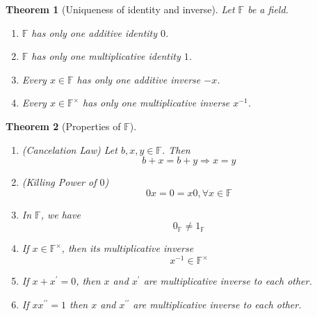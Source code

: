 \documentclass[12pt]{article}
\newtheorem{theorem}{Theorem}[section]
\theoremstyle{definition}
\begin{document}
\begin{theorem}[Uniqueness of identity and inverse]\normalfont Let $\mathbb{F}$ be a field.
\begin{enumerate}[label=(\arabic*)]
\item $\mathbb{F}$ has only one additive identity $0$.
\item $\mathbb{F}$ has only one multiplicative identity $1$.
\item Every $x\in\mathbb{F}$ has only one additive inverse $-x$.
\item Every $x\in\mathbb{F}^\times$ has only one multiplicative inverse $x^{-1}$.
\end{enumerate}
\end{theorem}
\begin{theorem}[Properties of $\mathbb{F}$]\hfill\\\normalfont
\begin{enumerate}[label=(\arabic*)]
\item (Cancelation Law) Let $b,x,y\in\mathbb{F}$. Then
\[
b+x=b+y\Rightarrow x=y
\]
\item (Killing Power of $0$)
\[
0x=0=x0,\forall x\in\mathbb{F}
\]
\item In $\mathbb{F}$, we have
\[
0_\mathbb{F}\neq 1_\mathbb{F}
\]
\item If $x\in\mathbb{F}^{\times}$, then its multiplicative inverse
\[
x^{-1}\in\mathbb{F}^\times
\]
\item If $x+x^\prime=0$, then $x$ and $x^\prime$ are multiplicative inverse to each other.
\item If $xx^{\prime\prime} = 1$ then $x$ and $x^{\prime\prime}$ are multiplicative inverse to each other.
\end{enumerate}
\end{theorem}
\end{document}
